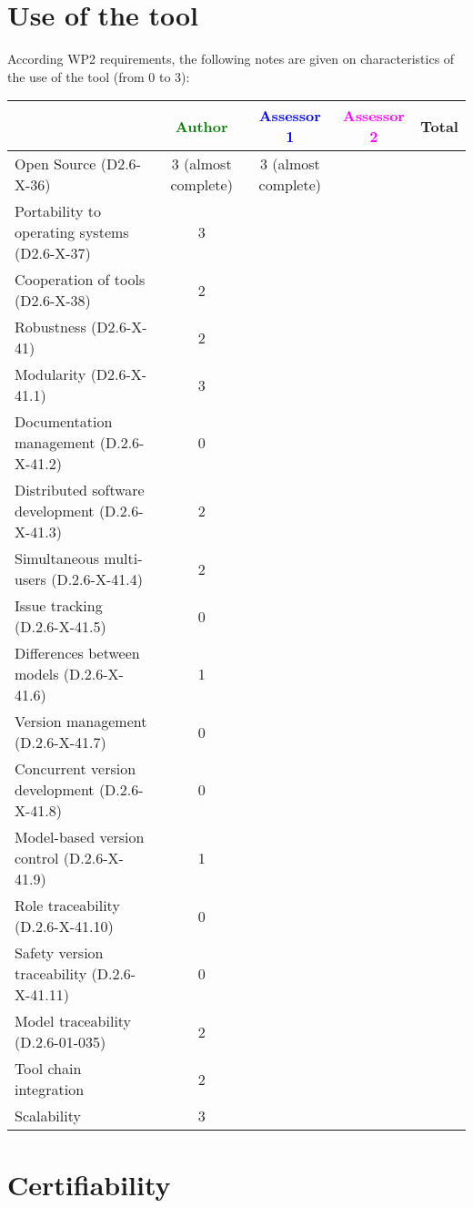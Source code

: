 \section{Use of the tool}


According WP2 requirements, the following notes are given on characteristics of the use of the tool (from 0 to 3):

\begin{tabular}{|l | c | c | c | c|}
\hline
& \textcolor{green}{Author} & \textcolor{blue}{Assessor 1} & \textcolor{magenta}{Assessor 2} & Total \\
\hline 
Open Source (D2.6-X-36) & 3 (almost complete)& 3 (almost complete) & &  \\
\hline 
Portability to operating systems (D2.6-X-37) & 3 & & &  \\
\hline
Cooperation of tools (D2.6-X-38) & 2 & & &  \\
\hline
Robustness (D2.6-X-41) & 2 & & & \\
\hline
Modularity (D2.6-X-41.1) & 3 & & & \\
\hline
Documentation management (D.2.6-X-41.2) & 0 & & & \\
\hline
Distributed software development (D.2.6-X-41.3)  & 2 & & & \\
\hline
Simultaneous multi-users (D.2.6-X-41.4)   & 2 & & & \\
\hline
Issue tracking (D.2.6-X-41.5) & 0 & & & \\
\hline
Differences between models (D.2.6-X-41.6) & 1 & & & \\
\hline
Version management (D.2.6-X-41.7) & 0 & & & \\
\hline
Concurrent version development (D.2.6-X-41.8) & 0 & & & \\
\hline
Model-based version control (D.2.6-X-41.9) & 1 & & & \\
\hline
Role traceability (D.2.6-X-41.10) & 0 & & & \\
\hline
Safety version traceability (D.2.6-X-41.11) & 0 & & & \\
\hline
Model traceability (D.2.6-01-035) & 2 & & & \\
\hline
Tool chain integration & 2 & & & \\
\hline
Scalability & 3 & & & \\
\hline
\end{tabular}

\section{Certifiability}

